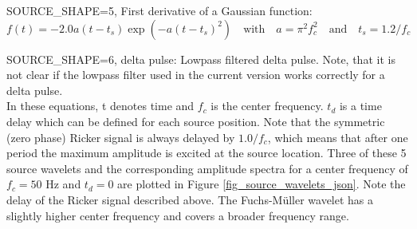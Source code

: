 SOURCE\_SHAPE=5, First derivative of a Gaussian function:
\begin{equation}
f(t)= -2.0 a (t-t_s) \exp(-a (t-t_s)^2)\quad \mbox{with} \quad a=\pi^2 f_c^2 \quad \mbox{and} \quad t_s=1.2/f_c
\label{eq_deriv_of_gaussian}
\end{equation}

SOURCE\_SHAPE=6, delta pulse: Lowpass filtered delta pulse. Note, that it is not clear if the lowpass filter used in the current version works correctly for a delta pulse.\\


In these equations, t denotes time and $f_c$ is the center frequency. $t_d$ is a time delay which can be defined for each source position. Note that the symmetric (zero phase) Ricker signal is always delayed by $1.0/f_c$, which means that after one period the maximum amplitude is excited at the source location. Three of these 5 source wavelets and the corresponding amplitude spectra for a center frequency of $f_c=50$ Hz and $t_d=0$ are plotted in Figure \ref{fig_source_wavelets_json}. Note the delay of the Ricker signal described above. The Fuchs-M\"uller wavelet has a slightly higher center frequency and covers a broader frequency range.
\newline

